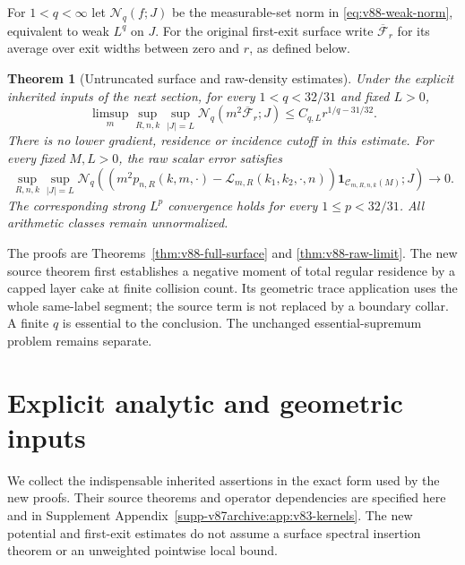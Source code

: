 \documentclass[11pt,reqno]{amsart}
\numberwithin{equation}{section}
\newtheorem{theorem}{Theorem}[section]
\theoremstyle{definition}
\theoremstyle{remark}\newtheorem{remark}[theorem]{Remark}
\newcommand{\one}{\mathbf1}\newcommand{\dd}{\,\mathrm d}
\begin{document}
For $1<q<\infty$ let $\mathcal N_q(f;J)$ be the measurable-set norm
in \eqref{eq:v88-weak-norm}, equivalent to weak $L^q$ on $J$.
For the original first-exit surface write $\overline{\mathcal F}_r$
for its average over exit widths between zero and $r$, as defined below.
\begin{theorem}[Untruncated surface and raw-density estimates]
\label{thm:v88-main}
Under the explicit inherited inputs of the next section, for every
$1<q<32/31$ and fixed $L>0$,
\[
 \limsup_m\sup_{R,n,k}\sup_{|J|=L}
 \mathcal N_q(m^2\overline{\mathcal F}_r;J)
                      \le C_{q,L}r^{1/q-31/32}.
\]
There is no lower gradient, residence or incidence cutoff in this
estimate. For every fixed $M,L>0$, the raw scalar error satisfies
\[
 \sup_{R,n,k}\sup_{|J|=L}
 \mathcal N_q\!\left(
 (m^2p_{n,R}(k,m,\cdot)-\mathcal L_{m,R}(k_1,k_2,\cdot,n))
 \one_{\mathcal C_{m,R,n,k}(M)};J\right)\longrightarrow0.
\]
The corresponding strong $L^p$ convergence holds for every
$1\le p<32/31$. All arithmetic classes remain unnormalized.
\end{theorem}
The proofs are Theorems~\ref{thm:v88-full-surface} and
\ref{thm:v88-raw-limit}. The new source theorem first establishes a
negative moment of total regular residence by a capped layer cake at
finite collision count. Its geometric trace application uses the
whole same-label segment; the source term is not replaced by a
boundary collar. A finite $q$ is essential to the conclusion. The
unchanged essential-supremum problem remains separate.

\section{Explicit analytic and geometric inputs}
We collect the indispensable inherited assertions in the exact form
used by the new proofs. Their source theorems and operator dependencies
are specified here and in Supplement Appendix~\ref{supp-v87archive:app:v83-kernels}. The new
potential and first-exit estimates do not assume a surface spectral
insertion theorem or an unweighted pointwise local bound.
\end{document}
